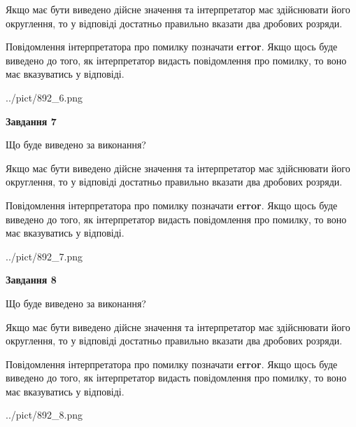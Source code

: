 \documentclass[12pt, ukrainian]{article}
\begin{document}
{\begin {Large}
Якщо має бути виведено дійсне значення та інтерпретатор має здійснювати його округлення, 
то у відповіді достатньо правильно вказати два дробових розряди.

Повідомлення інтерпретатора про помилку позначати \textbf{error}.
Якщо щось буде виведено до того, як інтерпретатор видасть повідомлення про помилку, 
то воно має вказуватись у відповіді. \par

\begin{center}
	{../pict/892_6.png}
\end{center}
\newpage

{\begin {center}\textbf{Завдання 7}\end {center}}\par
Що буде виведено за виконання? \par

Якщо має бути виведено дійсне значення та інтерпретатор має здійснювати його округлення, 
то у відповіді достатньо правильно вказати два дробових розряди.

Повідомлення інтерпретатора про помилку позначати \textbf{error}.
Якщо щось буде виведено до того, як інтерпретатор видасть повідомлення про помилку, 
то воно має вказуватись у відповіді. \par

\begin{center}
	{../pict/892_7.png}
\end{center}
\newpage

{\begin {center}\textbf{Завдання 8}\end {center}}\par
Що буде виведено за виконання? \par

Якщо має бути виведено дійсне значення та інтерпретатор має здійснювати його округлення, 
то у відповіді достатньо правильно вказати два дробових розряди.

Повідомлення інтерпретатора про помилку позначати \textbf{error}.
Якщо щось буде виведено до того, як інтерпретатор видасть повідомлення про помилку, 
то воно має вказуватись у відповіді. \par

\begin{center}
	{../pict/892_8.png}
\end{center}
\newpage


\end{Large}}
\end{document}
